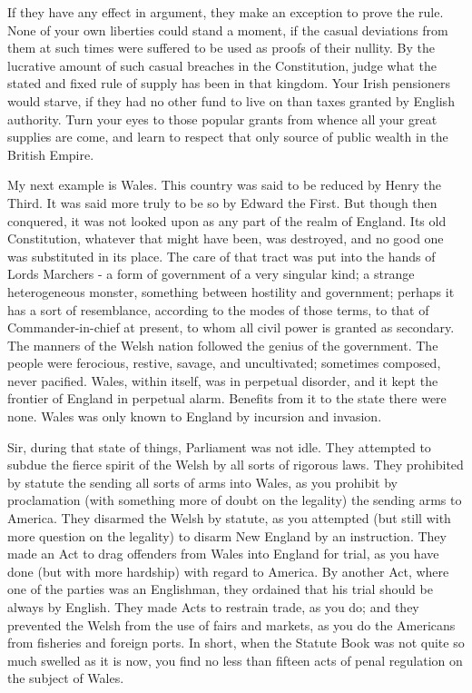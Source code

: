 If they have any effect in argument, they make an exception to prove the rule. None of your own liberties could stand a moment, if the casual deviations from them at such times were suffered to be used as proofs of their nullity. By the lucrative amount of such casual breaches in the Constitution, judge what the stated and fixed rule of supply has been in that kingdom. Your Irish pensioners would starve, if they had no other fund to live on than taxes granted by English authority. Turn your eyes to those popular grants from whence all your great supplies are come, and learn to respect that only source of public wealth in the British Empire.\par

My next example is Wales. This country was said to be reduced by Henry the Third. It was said more truly to be so by Edward the First. But though then conquered, it was not looked upon as any part of the realm of England. Its old Constitution, whatever that might have been, was destroyed, and no good one was substituted in its place. The care of that tract was put into the hands of Lords Marchers - a form of government of a very singular kind; a strange heterogeneous monster, something between hostility and government; perhaps it has a sort of resemblance, according to the modes of those terms, to that of Commander-in-chief at present, to whom all civil power is granted as secondary. The manners of the Welsh nation followed the genius of the government. The people were ferocious, restive, savage, and uncultivated; sometimes composed, never pacified. Wales, within itself, was in perpetual disorder, and it kept the frontier of England in perpetual alarm. Benefits from it to the state there were none. Wales was only known to England by incursion and invasion.\par

Sir, during that state of things, Parliament was not idle. They attempted to subdue the fierce spirit of the Welsh by all sorts of rigorous laws. They prohibited by statute the sending all sorts of arms into Wales, as you prohibit by proclamation (with something more of doubt on the legality) the sending arms to America. They disarmed the Welsh by statute, as you attempted (but still with more question on the legality) to disarm New England by an instruction. They made an Act to drag offenders from Wales into England for trial, as you have done (but with more hardship) with regard to America. By another Act, where one of the parties was an Englishman, they ordained that his trial should be always by English. They made Acts to restrain trade, as you do; and they prevented the Welsh from the use of fairs and markets, as you do the Americans from fisheries and foreign ports. In short, when the Statute Book was not quite so much swelled as it is now, you find no less than fifteen acts of penal regulation on the subject of Wales.\par

